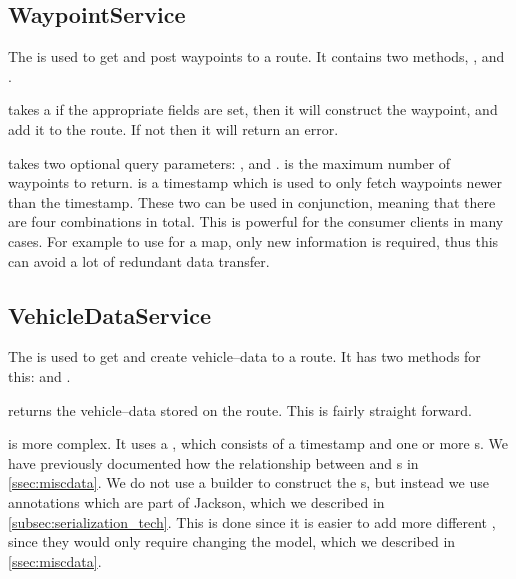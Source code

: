 \subsection{WaypointService}\label{subsec:waypointservice}
The  is used to get and post waypoints to a route.
It contains two methods, , and .

 takes a  if the appropriate fields are set, then it will construct the waypoint, and add it to the route.
If not then it will return an error.

 takes two optional query parameters: , and .
 is the maximum number of waypoints to return.
 is a timestamp which is used to only fetch waypoints newer than the timestamp.
These two can be used in conjunction, meaning that there are four combinations in total.
This is powerful for the consumer clients in many cases.
For example to use for a map, only new information is required, thus this can avoid a lot of redundant data transfer.

\subsection{VehicleDataService}\label{subsec:vehicledataservice}
The  is used to get and create vehicle--data to a route.
It has two methods for this:  and .

 returns the vehicle--data stored on the route.
This is fairly straight forward.

 is more complex.
It uses a , which consists of a timestamp and one or more s.
We have previously documented how the relationship between  and s in \cref{ssec:miscdata}.
We do not use a builder to construct the s, but instead we use annotations which are part of Jackson, which we described in \cref{subsec:serialization_tech}.
This is done since it is easier to add more different , since they would only require changing the model, which we described in \cref{ssec:miscdata}.
